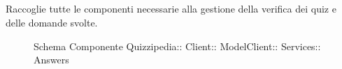 \subsection{}
Raccoglie tutte le componenti necessarie alla gestione della verifica dei quiz e delle domande svolte.
\begin{figure}[H]
\centering
\noindent{}
\caption[Schema Componente Answers]{Schema Componente Quizzipedia:: Client:: ModelClient:: Services:: Answers}
\end{figure}

